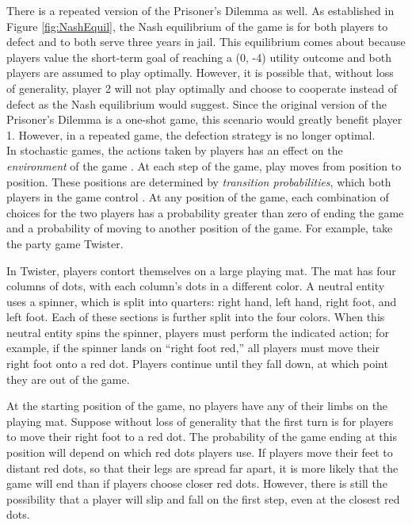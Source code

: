 There is a repeated version of the Prisoner's Dilemma as well. As established in Figure \ref{fig:NashEquil}, the Nash equilibrium of the game is for both players to defect and to both serve three years in jail. This equilibrium comes about because players value the short-term goal of reaching a (0, -4) utility outcome \cite{osbo94} and both players are assumed to play optimally. However, it is possible that, without loss of generality, player 2 will not play optimally and choose to cooperate instead of defect as the Nash equilibrium would suggest. Since the original version of the Prisoner's Dilemma is a one-shot game, this scenario would greatly benefit player 1. However, in a repeated game, the defection strategy is no longer optimal.\\

In stochastic games, the actions taken by players has an effect on the \textit{environment} of the game \cite{sola15}. At each step of the game, play moves from position to position. These positions are determined by \textit{transition probabilities}, which both players in the game control \cite{shap53}. At any position of the game, each combination of choices for the two players has a probability greater than zero of ending the game and a probability of moving to another position of the game. For example, take the party game Twister.
\begin{exmp}
  In Twister, players contort themselves on a large playing mat. The mat has four columns of dots, with each column's dots in a different color. A neutral entity uses a spinner, which is split into quarters: right hand, left hand, right foot, and left foot. Each of these sections is further split into the four colors. When this neutral entity spins the spinner, players must perform the indicated action; for example, if the spinner lands on ``right foot red,'' all players must move their right foot onto a red dot. Players continue until they fall down, at which point they are out of the game.
\end{exmp}

At the starting position of the game, no players have any of their limbs on the playing mat. Suppose without loss of generality that the first turn is for players to move their right foot to a red dot. The probability of the game ending at this position will depend on which red dots players use. If players move their feet to distant red dots, so that their legs are spread far apart, it is more likely that the game will end than if players choose closer red dots. However, there is still the possibility that a player will slip and fall on the first step, even at the closest red dots.\\


